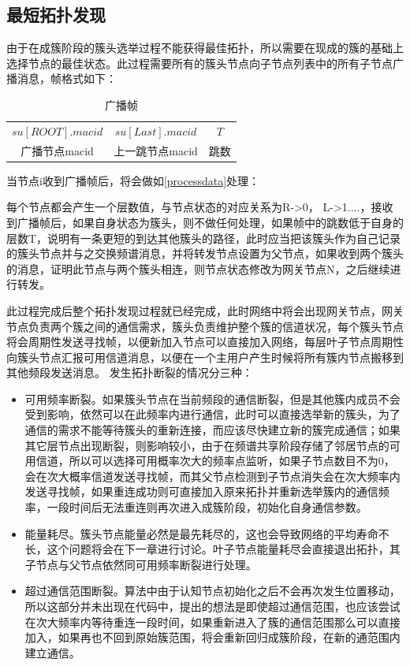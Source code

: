 \documentclass[a4paper,AutoFakeBold,oneside,12pt]{book}
\begin{document}
  \subsection{最短拓扑发现}
  由于在成簇阶段的簇头选举过程不能获得最佳拓扑，所以需要在现成的簇的基础上选择节点的最佳状态。此过程需要所有的簇头节点向子节点列表中的所有子节点广播消息，帧格式如下：

\begin{table}[h]
  \setlength{\belowcaptionskip}{7pt}
  \centering
  \caption{广播帧}
  \begin{tabular}{|c|c|c|} 
  $su[ROOT].macid$&$su[Last].macid$&$T$\\
  广播节点macid&上一跳节点macid&跳数
  \end{tabular}
  \end{table}

  当节点i收到广播帧后，将会做如\ref{processdata}处理：
  
  每个节点都会产生一个层数值，与节点状态的对应关系为R->0， L->1....，接收到广播帧后，如果自身状态为簇头，则不做任何处理，如果帧中的跳数低于自身的层数T，说明有一条更短的到达其他簇头的路径，此时应当把该簇头作为自己记录的簇头节点并与之交换频谱消息，并将转发节点设置为父节点，如果收到两个簇头的消息，证明此节点与两个簇头相连，则节点状态修改为网关节点N，之后继续进行转发。
  
  此过程完成后整个拓扑发现过程就已经完成，此时网络中将会出现网关节点，网关节点负责两个簇之间的通信需求，簇头负责维护整个簇的信道状况，每个簇头节点将会周期性发送寻找帧，以便新加入节点可以直接加入网络，每层叶子节点周期性向簇头节点汇报可用信道消息，以便在一个主用户产生时候将所有簇内节点搬移到其他频段发送消息。
  发生拓扑断裂的情况分三种：
  \begin{itemize}
  \item 可用频率断裂。如果簇头节点在当前频段的通信断裂，但是其他簇内成员不会受到影响，依然可以在此频率内进行通信，此时可以直接选举新的簇头，为了通信的需求不能等待簇头的重新连接，而应该尽快建立新的簇完成通信；如果其它层节点出现断裂，则影响较小，由于在频谱共享阶段存储了邻居节点的可用信道，所以可以选择可用概率次大的频率点监听，如果子节点数目不为0，会在次大概率信道发送寻找帧，而其父节点检测到子节点消失会在次大频率内发送寻找帧，如果重连成功则可直接加入原来拓扑并重新选举簇内的通信频率，一段时间后无法重连则再次进入成簇阶段，初始化自身通信参数。
  \item 能量耗尽。簇头节点能量必然是最先耗尽的，这也会导致网络的平均寿命不长，这个问题将会在下一章进行讨论。叶子节点能量耗尽会直接退出拓扑，其子节点与父节点依然同可用频率断裂进行处理。
  \item 超过通信范围断裂。算法中由于认知节点初始化之后不会再次发生位置移动，所以这部分并未出现在代码中，提出的想法是即使超过通信范围，也应该尝试在次大频率内等待重连一段时间，如果重新进入了簇的通信范围那么可以直接加入，如果再也不回到原始簇范围，将会重新回归成簇阶段，在新的通范围内建立通信。
  \end{itemize}
\end{document}
